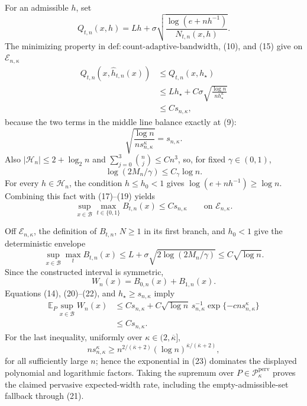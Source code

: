 For an admissible \(h\), set
\[
Q_{t,n}(x,h)=Lh+\sigma
\sqrt{\frac{\log(e+nh^{-1})}{N_{t,n}(x,h)}}.
\]
The minimizing property in \(\mathrm{def:count\text{-}adaptive\text{-}bandwidth}\), (10), and (15) give on \(\mathcal E_{n,\kappa}\)
\[
\begin{aligned}
Q_{t,n}(x,\widehat h_{t,n}(x))
&\le Q_{t,n}(x,h_\star)\\
&\le Lh_\star+C\sigma
\sqrt{\frac{\log n}{nh_\star^\kappa}}\\
&\le C s_{n,\kappa},
\end{aligned}\tag{17}
\]
because the two terms in the middle line balance exactly at (9):
\[
\sqrt{\frac{\log n}{ns_{n,\kappa}^\kappa}}
=s_{n,\kappa}. \tag{18}
\]
Also \(|\mathcal H_n|\le2+\log_2 n\) and \(\sum_{j=0}^3\binom nj\le Cn^3\), so, for fixed \(\gamma\in(0,1)\),
\[
\log(2M_n/\gamma)\le C_\gamma\log n. \tag{19}
\]
For every \(h\in\mathcal H_n\), the condition \(h\le h_0<1\) gives \(\log(e+nh^{-1})\ge\log n\). Combining this fact with (17)--(19) yields
\[
\sup_{x\in\mathcal B}\max_{t\in\{0,1\}}B_{t,n}(x)
\le Cs_{n,\kappa}
\qquad\text{on }\mathcal E_{n,\kappa}. \tag{20}
\]

Off \(\mathcal E_{n,\kappa}\), the definition of \(B_{t,n}\), \(N\ge1\) in its first branch, and \(h_0<1\) give the deterministic envelope
\[
\sup_{x\in\mathcal B}\max_t B_{t,n}(x)
\le L+\sigma\sqrt{2\log(2M_n/\gamma)}
\le C\sqrt{\log n}. \tag{21}
\]
Since the constructed interval is symmetric,
\[
W_n(x)=B_{0,n}(x)+B_{1,n}(x). \tag{22}
\]
Equations (14), (20)--(22), and \(h_\star\ge s_{n,\kappa}\) imply
\[
\begin{aligned}
\mathbb E_P\sup_{x\in\mathcal B}W_n(x)
&\le Cs_{n,\kappa}
+C\sqrt{\log n}\,s_{n,\kappa}^{-1}
\exp\{-cns_{n,\kappa}^\kappa\}\\
&\le Cs_{n,\kappa}.
\end{aligned}\tag{23}
\]
For the last inequality, uniformly over \(\kappa\in(2,\overline\kappa]\),
\[
ns_{n,\kappa}^\kappa
\ge n^{2/(\overline\kappa+2)}
(\log n)^{\overline\kappa/(\overline\kappa+2)},
\]
for all sufficiently large \(n\); hence the exponential in (23) dominates the displayed polynomial and logarithmic factors. Taking the supremum over \(P\in\mathcal P_{\kappa}^{\mathrm{perv}}\) proves the claimed pervasive expected-width rate, including the empty-admissible-set fallback through (21).

